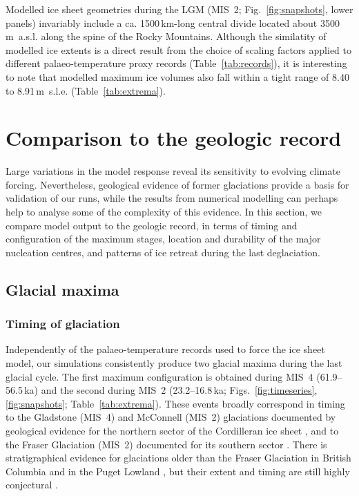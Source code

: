 \documentclass[tc]{copernicus}
\begin{document}
Modelled ice sheet geometries during the LGM (MIS~2; Fig.~\ref{fig:snapshots},
lower panels) invariably include a ca. 1500\,km-long central divide located
about 3500\,m~a.s.l. along the spine of the Rocky Mountains. Although the
similatity of modelled ice extents is a direct result from the choice of scaling
factors applied to different palaeo-temperature proxy records
(Table~\ref{tab:records}), it is interesting to note that modelled maximum ice
volumes also fall within a tight range of 8.40 to 8.91\,m~s.l.e.
(Table~\ref{tab:extrema}).


\section{Comparison to the geologic record}
\label{sec:discussion}

Large variations in the model response reveal its sensitivity to evolving
climate forcing. Nevertheless, geological evidence of former glaciations
provide a basis for validation of our runs, while the results from numerical
modelling can perhaps help to analyse some of the complexity of this evidence.
In this section, we compare model output to the geologic record, in terms of
timing and configuration of the maximum stages, location and durability of the
major nucleation centres, and patterns of ice retreat during the last
deglaciation.

\subsection{Glacial maxima}

\subsubsection{Timing of glaciation}
\label{sec:timing}

Independently of the palaeo-temperature records
used to force the ice sheet model, our simulations consistently produce two
glacial maxima during the last glacial cycle. The first maximum configuration
is obtained during MIS~4 (61.9--56.5\,ka) and the second during MIS~2
(23.2--16.8\,ka; Figs.~\ref{fig:timeseries}, \ref{fig:snapshots};
Table~\ref{tab:extrema}). These events broadly correspond in timing to the
Gladstone
(MIS~4) and McConnell (MIS~2) glaciations documented by geological evidence for
the northern sector of the Cordilleran ice sheet
    \citep{Duk-Rodkin.etal.1996, Ward.etal.2007,
           Stroeven.etal.2010, Stroeven.etal.2014},
and to the Fraser Glaciation (MIS~2) documented for its southern sector
    \citep{Porter.Swanson.1998, Margold.etal.2014}.
There is stratigraphical evidence for glaciations older than the Fraser
Glaciation in British Columbia \citep{Clague.Ward.2011} and in the Puget
Lowland \citep{Troost.2014}, but their extent and
timing are still highly conjectural
    \citep[perhaps MIS~4 or early MIS~3; e.g.,][]{Cosma.etal.2008}.
\end{document}
